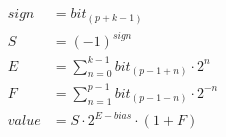 \begin{equation*}
\begin{aligned}
    sign &= bit_{(p+k-1)} \\
    S &= (-1)^{sign} \\
    E &= \sum_{n=0}^{k-1}{bit_{(p-1+n)} \cdot 2^n} \\
    F &= \sum_{n=1}^{p-1}{bit_{(p-1-n)} \cdot 2^{-n}} \\
    value &= S \cdot 2^{E-bias} \cdot (1 + F) \\
\end{aligned}
\label{eq:float_value}
\end{equation*}
